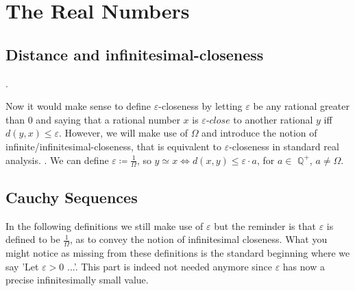 \section{The Real Numbers}
\subsection{Distance and infinitesimal-closeness}
.
\newline

\noin Now it would make sense to define $\varepsilon$-closeness by letting $\varepsilon$ be any rational greater than $0$ and saying that a rational number $x$ is $\varepsilon$-$close$ to another rational $y$ iff $d(y,x)\leq \varepsilon$. However, we will make use of $\Omega$ and introduce the notion of infinite/infinitesimal-closeness, that is equivalent to $\varepsilon$-closeness in standard real analysis.
. 
\newline We can define $\varepsilon \coloneqq \frac{1}{\Omega}$, so $y \simeq x \iff d(x,y) \leq \varepsilon \cdot a$, for $a \in$ $\mathbb{Q}^{+}$, $a \neq \Omega$.

\subsection{Cauchy Sequences}
In the following definitions we still make use of $\varepsilon$ but the reminder is that $\varepsilon$ is defined to be $\frac{1}{\Omega}$, as to convey the notion of infinitesimal closeness. What you might notice as missing from these definitions is the standard beginning where we say 'Let $\varepsilon > 0$ ...'. This part is indeed not needed anymore since $\varepsilon$ has now a precise infinitesimally small value. 

